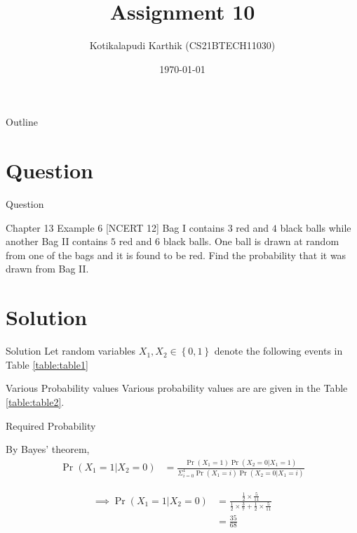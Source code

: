 \documentclass{beamer}
\title{Assignment 10}
\author{Kotikalapudi Karthik (CS21BTECH11030)}
\date{\today}
\providecommand{\pr}[1]{\ensuremath{\Pr\left(#1\right)}}
\providecommand{\cbrak}[1]{\ensuremath{\left\{#1\right\}}}
\begin{document}
\begin{frame}
    \titlepage 
\end{frame}

\logo{}


\begin{frame}{Outline}
    \tableofcontents
\end{frame}

\section{Question}
\begin{frame}{Question}
    \begin{block}{Chapter 13 Example 6 [NCERT 12]} 
        Bag I contains $3$ red and $4$ black balls while another Bag II contains $5$ red and $6$ black balls. One ball is drawn at random from one of the bags and it is found to be red. Find the probability that it was drawn from Bag II.
    \end{block}
\end{frame}

\section{Solution}
\begin{frame}{Solution}
Let random variables $X_1, X_2 \in \cbrak{0,1}$ denote the following events in Table \eqref{table:table1}
\begin{table}[ht!]
	\centering
	
	\caption{}
	\label{table:table1}	
\end{table}
\end{frame}

\begin{frame}{Various Probability values}
    Various probability values are are given in the Table \eqref{table:table2}.
	\begin{table}[ht!]
		
		\caption{}
		\label{table:table2}	
	\end{table}
\end{frame}

\begin{frame}{Required Probability}
   \begin{block}{By Bayes' theorem,}
   \begin{align}
    \pr{X_1=1|X_2=0}&= \frac{\pr{X_1=1}\pr{X_2=0|X_1=1}}{\Sigma^{1}_{i=0}\pr{X_1=i}\pr{X_2=0|X_1=i}}
    \end{align}
    \end{block}
    \begin{align}
        \implies \pr{X_1=1|X_2=0}&= \frac{\frac{1}{2} \times \frac{5}{11}}{\frac{1}{2} \times \frac{3}{7} + \frac{1}{2} \times \frac{5}{11}}
        \\
        &= \frac{35}{68}
    \end{align}
\end{frame}
\end{document}

